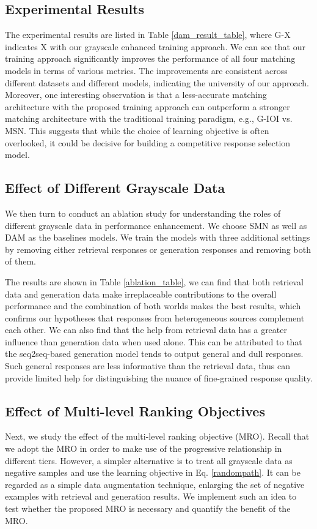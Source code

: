 \documentclass[11pt,a4paper]{article}
\begin{document}
	\subsection{Experimental Results}
	The experimental results are listed in Table \ref{dam_result_table}, where G-X indicates X with our grayscale enhanced training approach. We can see that our training approach significantly improves the performance of all four matching models in terms of various metrics. The improvements are consistent across different datasets and different models, indicating the university of our approach. Moreover, one interesting observation is that a less-accurate matching architecture with the proposed training approach can outperform a stronger matching architecture with the traditional training paradigm, e.g., G-IOI vs. MSN. This suggests that while the choice of learning objective is often overlooked, it could be decisive for building a competitive response selection model.
	\subsection{Effect of Different Grayscale Data}
	We then turn to conduct an ablation study for understanding the roles of different grayscale data in performance enhancement. We choose SMN as well as DAM as the baselines models. We train the models with three additional settings by removing either retrieval responses or generation responses and removing both of them. 
	
	The results are shown in Table \ref{ablation_table}, we can find that both retrieval data and generation data make irreplaceable contributions to the overall performance and the combination of both worlds makes the best results, which confirms our hypotheses that responses from heterogeneous sources complement each other. We can also find that the help from retrieval data has a greater influence than generation data when used alone. This can be attributed to that the seq2seq-based generation model tends to output general and dull responses. Such general responses are less informative than the retrieval data, thus can provide limited
	help for distinguishing the nuance of fine-grained response quality. \subsection{Effect of Multi-level Ranking Objectives}
	Next, we study the effect of the multi-level ranking objective (MRO). Recall that we adopt the MRO in order to make use of the progressive relationship in different tiers. However, a simpler alternative is to treat all grayscale data as negative samples and use the learning objective in Eq. \ref{randompath}. It can be regarded as a simple data augmentation technique, enlarging the set of negative examples with retrieval and generation results. We implement such an idea to test whether the proposed MRO is necessary and quantify the benefit of the MRO.
	
\end{document}
